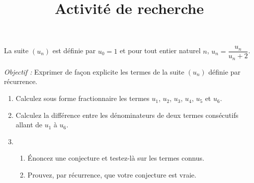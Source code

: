 \documentclass[a4paper,12pt,french]{article}
\title{Activité de recherche}
\date{}
\begin{document}
\maketitle

\begin{Exercise}[number=33]
  La suite $(u_n)$ est définie par $u_0 = 1$ et pour tout entier naturel
  $n$, $u_n = \dfrac{u_n}{u_n + 2}$.

  \emph{Objectif :} Exprimer de façon explicite les termes de la suite
  $(u_n)$ définie par récurrence.

  \begin{enumerate}
    \item Calculez sous forme fractionnaire les termes $u_1$, $u_2$,
      $u_3$, $u_4$, $u_5$ et $u_6$.
    \item Calculez la différence entre les dénominateurs de deux termes
      consécutifs allant de $u_1$ à $u_6$.
    \item
      \begin{enumerate}
        \item Énoncez une conjecture et testez-là sur les termes connus.
        \item Prouvez, par récurrence, que votre conjecture est vraie.
      \end{enumerate}
  \end{enumerate}
\end{Exercise}
\pagebreak
\begin{Answer}[number=104]
\end{Answer}
\end{document}
